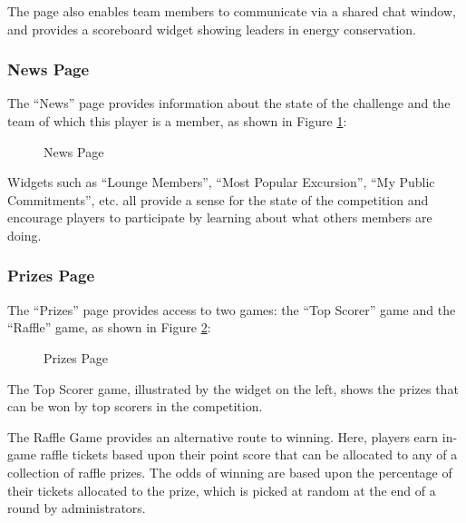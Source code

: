 The page also enables team members to communicate via a shared chat window, and provides a scoreboard widget showing leaders in energy conservation.

\clearpage

\subsubsection{News Page}

The ``News'' page provides information about the state of the challenge and the team of which this player is a member, as shown in Figure \ref{fig:makahiki-news}:

\begin{figure}[!ht]
\begin{center}
\end{center}
\caption{News Page}
\label{fig:makahiki-news}
\end{figure}

Widgets such as ``Lounge Members'', ``Most Popular Excursion'', ``My Public Commitments'', etc. all provide a sense for the state of the competition and encourage players to participate by learning about what others members are doing.

\clearpage

\subsubsection{Prizes Page}

The ``Prizes'' page provides access to two games: the ``Top Scorer'' game and the ``Raffle'' game, as shown in Figure \ref{fig:makahiki-prizes}:

\begin{figure}[!ht]
\begin{center}
\end{center}
\caption{Prizes Page}
\label{fig:makahiki-prizes}
\end{figure}

The Top Scorer game, illustrated by the widget on the left, shows the prizes that can be won by top scorers in the competition.

The Raffle Game provides an alternative route to winning. Here, players earn in-game raffle tickets based upon their point score that can be allocated to any of a collection of raffle prizes. The odds of winning are based upon the percentage of their tickets allocated to the prize, which is picked at random at the end of a round by administrators.

